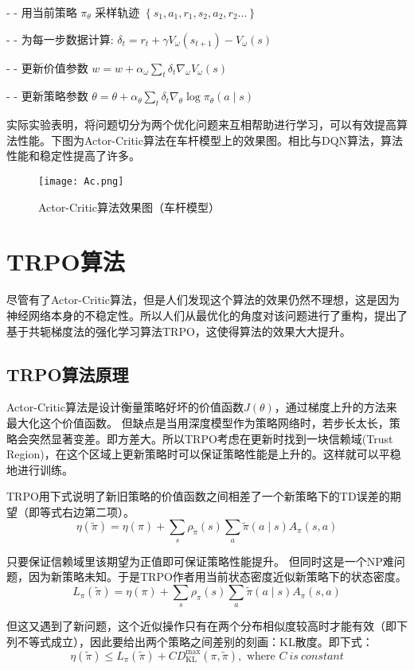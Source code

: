 - - 用当前策略 $\pi_{\theta}$ 采样轨迹 $\left\{s_{1}, a_{1}, r_{1}, s_{2}, a_{2}, r_{2} \ldots\right\}$

- - 为每一步数据计算: $\delta_{t}=r_{t}+\gamma V_{\omega}\left(s_{t+1}\right)-V_{\omega}(s)$

- - 更新价值参数 $w=w+\alpha_{\omega} \sum_{t} \delta_{t} \nabla_{\omega} V_{\omega}(s)$

- - 更新策略参数 $\theta=\theta+\alpha_{\theta} \sum_{t} \delta_{t} \nabla_{\theta} \log \pi_{\theta}(a \mid s)$

实际实验表明，将问题切分为两个优化问题来互相帮助进行学习，可以有效提高算法性能。下图为Actor-Critic算法在车杆模型上的效果图。相比与DQN算法，算法性能和稳定性提高了许多。
\begin{figure}[hbt]
    \centering
    \texttt{[image: Ac.png]}
	\vspace{-0.5cm}
    \caption{Actor-Critic算法效果图（车杆模型）}
    \label{Actor-Critic}
\end{figure}

\section{TRPO算法}
\cite{schulman2015trust}尽管有了Actor-Critic算法，但是人们发现这个算法的效果仍然不理想，这是因为神经网络本身的不稳定性。所以人们从最优化的角度对该问题进行了重构，提出了基于共轭梯度法的强化学习算法TRPO，这使得算法的效果大大提升。
\subsection{TRPO算法原理}
Actor-Critic算法是设计衡量策略好坏的价值函数$J(\theta)$，通过梯度上升的方法来最大化这个价值函数。	但缺点是当用深度模型作为策略网络时，若步长太长，策略会突然显著变差。即方差大。所以TRPO考虑在更新时找到一块信赖域(Trust Region)，在这个区域上更新策略时可以保证策略性能是上升的。这样就可以平稳地进行训练。

TRPO用下式说明了新旧策略的价值函数之间相差了一个新策略下的TD误差的期望（即等式右边第二项）。
$$\eta(\tilde{\pi})=\eta(\pi)+\sum_{s} \rho_{\tilde{\pi}}(s) \sum_{a} \tilde{\pi}(a \mid s) A_{\pi}(s, a)$$

只要保证信赖域里该期望为正值即可保证策略性能提升。
但同时这是一个NP难问题，因为新策略未知。于是TRPO作者用当前状态密度近似新策略下的状态密度。
$$
L_{\pi}(\tilde{\pi})=\eta(\pi)+\sum_{s} \rho_{\pi}(s) \sum_{a} \tilde{\pi}(a \mid s) A_{\pi}(s, a)
$$

但这又遇到了新问题，这个近似操作只有在两个分布相似度较高时才能有效（即下列不等式成立），因此要给出两个策略之间差别的刻画：KL散度\cite{schulman2015trust}。即下式：
$$
\eta(\tilde{\pi}) \leq L_{\pi}(\tilde{\pi})+C D_{\mathrm{KL}}^{\max }(\pi, \tilde{\pi}), \text { where } C\ is\ constant
$$

